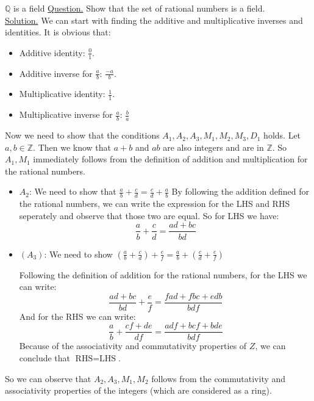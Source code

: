\begin{example}{$ \mathbb{Q} $ is a field}
	\underline{Question.} Show that the set of rational numbers is a field.  \\
	
	\underline{Solution.} We can start with finding the additive and multiplicative inverses and identities. It is obvious that:
	\begin{itemize}
		\item Additive identity: $ \frac{0}{1} $.
		\item Additive inverse for $ \frac{a}{b}$: $ \frac{-a}{b} $.
		\item Multiplicative identity: $ \frac{1}{1} $.
		\item Multiplicative inverse for $ \frac{a}{b} $: $ \frac{b}{a} $
	\end{itemize}

	Now we need to show that the conditions $ A_1, A_2, A_3, M_1, M_2, M_3, D_1 $ holds.
	Let $ a,b \in \mathbb{Z} $. Then we know that $ a+b $ and $ ab $ are also integers and are in $ \mathbb{Z} $. So $ A_1, M_1 $ immediately follows from the definition of addition and multiplication for the rational numbers. 
	\begin{itemize}
		
		\item $ A_2 $: We need to show that $ \frac{a}{b} + \frac{c}{d} = \frac{c}{d} + \frac{a}{b} $
		By following the addition defined for the rational numbers, we can write the expression for the LHS and RHS seperately and observe that those two are equal. So for LHS we have:
		\[  \frac{a}{b} + \frac{c}{d} = \frac{ad + bc}{bd} \]
		
		\item $ (A_3) $: We need to show $ (\frac{a}{b} + \frac{c}{d}) + \frac{e}{f} = \frac{a}{b} + (\frac{c}{d} + \frac{e}{f})   $
		
		Following the definition of addition for the rational numbers, for the LHS we can write:
		\[ \frac{ad+bc}{bd} + \frac{e}{f} = \frac{fad + fbc + edb}{bdf} \]
		And for the RHS we can write:
		\[ \frac{a}{b} + \frac{cf + de}{df} = \frac{adf + bcf + bde}{bdf} \]
		Because of the associativity and commutativity properties of $ Z $, we can conclude that $ \text{RHS} = \text{LHS} $. 
		
		
	
	\end{itemize}

	So we can observe that $ A_2, A_3, M_1, M_2 $ follows from the commutativity and associativity properties of the integers (which are considered as a ring).
\end{example}
